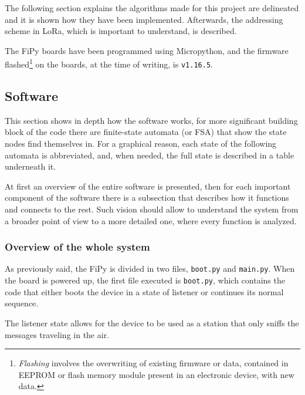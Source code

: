 		The following section explains the algorithms made for this project are delineated and it is shown how they have been implemented.
		Afterwards, the addressing scheme in LoRa, which is important to understand, is described.
		
		The FiPy boards have been programmed using Micropython, and the firmware flashed\footnote{ \textit{Flashing} involves the overwriting of existing firmware or data, contained in EEPROM or flash memory module present in an electronic device, with new data.} on the boards, at the time of writing, is \texttt{v1.16.5}.
		
		\subsection{Software}\label{subsec:algorithms}
	
			

			This section shows in depth how the software works, for more significant building block of the code there are finite-state automata (or FSA) that show the state nodes find themselves in.
			For a graphical reason, each state of the following automata is abbreviated, and, when needed, the full state is described in a table underneath it.
			
			At first an overview of the entire software is presented, then for each important component of the software there is a subsection that describes how it functions and connects to the rest.
			Such vision should allow to understand the system from a broader point of view to a more detailed one, where every function is analyzed.
			
			\subsubsection{Overview of the whole system}
			
				As previously said, the FiPy is divided in two files, \texttt{boot.py} and \texttt{main.py}.
				When the board is powered up, the first file executed is \texttt{boot.py}, which contains the code that either boots the device in a state of listener or continues its normal sequence.
				
				The listener state allows for the device to be used as a station that only sniffs the messages traveling in the air.
				
